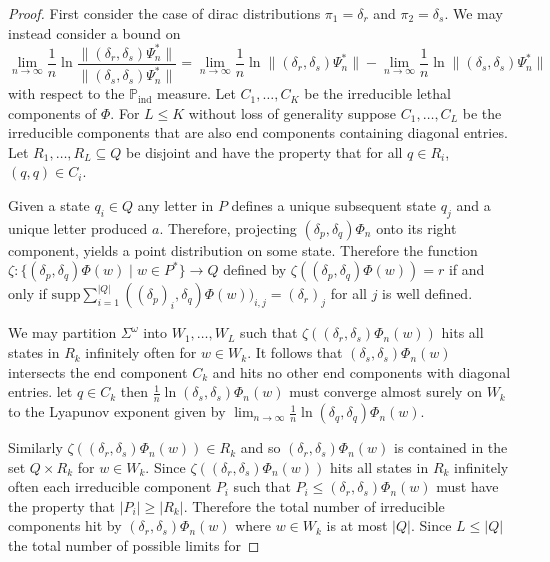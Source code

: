 \documentclass[a4paper,UKenglish,cleveref, autoref,mathscr]{lipics-v2019}
\newcommand{\PP}{\mathbb{P}}
\newcommand{\1}{\mathbbm{1}}
\newcommand{\supp}{\mathrm{supp}}
\begin{document}
\begin{proof}
First consider the case of dirac distributions $\pi_1 = \delta_r$ and $\pi_2 = \delta_s$. We may instead consider a bound on
\begin{equation*}
\lim_{n \rightarrow \infty} \frac{1}{n} \ln \frac{\| (\delta_r, \delta_s) \Psi_n^* \|}{\| (\delta_s, \delta_s) \Psi_n^* \|} = \lim_{n \rightarrow \infty} \frac1n \ln \| (\delta_r, \delta_s) \Psi_n^*\| - \lim_{n \rightarrow \infty} \frac1n \ln \| (\delta_s, \delta_s) \Psi_n^*\|
\end{equation*}
with respect to the $\PP_\text{ind}$ measure. Let $C_1, \dots, C_K$ be the irreducible lethal components of $\Phi$. For $L \leq K$ without loss of generality suppose $C_1, \dots, C_L$ be the irreducible components that are also end components containing diagonal entries. Let $R_1, \dots, R_L \subseteq Q$ be disjoint and have the property that for all $q \in R_i$, $(q, q) \in C_i$. 

Given a state $q_i \in Q$ any letter in $P$ defines a unique subsequent state $q_j$ and a unique letter produced $a$. Therefore, projecting $(\delta_p, \delta_q) \Phi_n$ onto its right component, yields a point distribution on some state. Therefore the function $\zeta : \{(\delta_p, \delta_q) \Phi(w) \mid w \in P^*\} \rightarrow Q$ defined by $\zeta((\delta_p, \delta_q) \Phi(w)) = r$ if and only if $\supp \sum_{i = 1}^{|Q|} ((\delta_p)_i, \delta_q) \Phi(w))_{i,j} = (\delta_r)_j$ for all $j$ is well defined.

We may partition $\Sigma^\omega$ into $W_1, \dots, W_L$ such that $\zeta((\delta_r, \delta_s) \Phi_n(w))$ hits all states in $R_k$ infinitely often for $w \in W_k$. It follows that $(\delta_s, \delta_s) \Phi_n(w)$ intersects the end component $C_k$ and hits no other end components with diagonal entries. let $q \in C_k$ then $\frac1n \ln(\delta_s, \delta_s) \Phi_n(w)$ must converge almost surely on $W_k$ to the Lyapunov exponent given by $\lim_{n \rightarrow \infty} \frac1n \ln(\delta_q, \delta_q) \Phi_n(w)$.

Similarly $\zeta((\delta_r, \delta_s) \Phi_n(w)) \in R_k$ and so $(\delta_r, \delta_s) \Phi_n(w)$ is contained in the set $Q \times R_k$ for $w \in W_k$. Since $\zeta((\delta_r, \delta_s) \Phi_n(w))$ hits all states in $R_k$ infinitely often each irreducible component $P_i$ such that $P_i \leq (\delta_r, \delta_s) \Phi_n(w)$ must have the property that $|P_i| \geq |R_k|$. Therefore the total number of irreducible components hit by $(\delta_r, \delta_s) \Phi_n(w)$ where $w \in W_k$ is at most $|Q|$. Since $L \leq |Q|$ the total number of possible limits for 


\end{proof}
\end{document}
